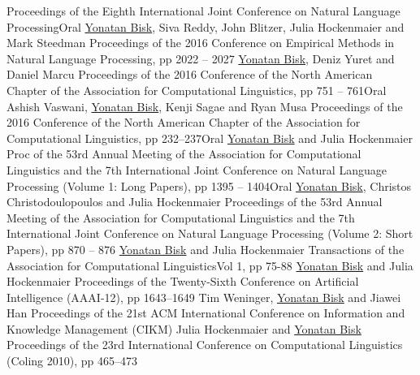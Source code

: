 \documentclass[10pt,letter]{moderncv}
\newcommand{\YB}{\underline{Yonatan Bisk}}
\begin{document}
  {Proceedings of the Eighth International Joint Conference on Natural Language Processing}{Oral}{}
  {\href{http://yonatanbisk.com/papers/2016-EMNLP.pdf}{\color{linkcolor}{Evaluating Induced CCG Parsers on Grounded Semantic Parsing}}}
{\YB{}, Siva Reddy, John Blitzer, Julia Hockenmaier and Mark Steedman}
  {Proceedings of the 2016 Conference on Empirical Methods in Natural Language Processing, pp 2022 -- 2027}{}{}
\pub{--}
  {\href{http://yonatanbisk.com/papers/2016-NAACL.pdf}{\color{linkcolor}{Natural Language Communication with Robots}}}
  {\YB{}, Deniz Yuret and Daniel Marcu}
  {Proceedings of the 2016 Conference of the North American Chapter of the Association for Computational Linguistics, pp 751 -- 761}{Oral}{}
\pub{--}
  {\href{http://yonatanbisk.com/papers/2016-NAACLShort.pdf}{\color{linkcolor}{Supertagging With LSTMs}}}
  {Ashish Vaswani, \YB, Kenji Sagae and Ryan Musa}
  {Proceedings of the 2016 Conference of the North American Chapter of the Association for Computational Linguistics, pp 232--237}{Oral}{}
  {\href{http://yonatanbisk.com/papers/2015-ACL.pdf}{\color{linkcolor}{Probing the Linguistic Strengths and Limitations of Unsupervised Grammar Induction}}}
  {\YB{} and Julia Hockenmaier}
  {Proc of the 53rd Annual Meeting of the Association for Computational Linguistics and the 7th International Joint Conference on Natural Language Processing (Volume 1: Long Papers), pp 1395 -- 1404}{Oral}{}
\pub{--}
  {\href{http://yonatanbisk.com/papers/2015-ACLShort-Fixed.pdf}{\color{linkcolor}{Labeled Grammar Induction with Minimal Supervision}}}
  {\YB, Christos Christodoulopoulos and Julia Hockenmaier}
  {Proceedings of the 53rd Annual Meeting of the Association for Computational Linguistics and the 7th International Joint Conference on Natural Language Processing (Volume 2: Short Papers), pp 870 -- 876 }{}{}
  {\href{http://yonatanbisk.com/papers/2013-TACL.pdf}{\color{linkcolor}{An HDP Model for Inducing Combinatory Categorial Grammars}}}
  {\YB{} and Julia Hockenmaier}
  {Transactions of the Association for Computational Linguistics}{Vol 1, pp 75-88}{}
  {\href{http://yonatanbisk.com/papers/2012-AAAI.pdf}{\color{linkcolor}{Simple Robust Grammar Induction with Combinatory Categorial Grammars}}}
  {\YB{} and Julia Hockenmaier}
  {Proceedings of the Twenty-Sixth Conference on Artificial Intelligence (AAAI-12), pp 1643--1649}{}{}
\pub{--}
  {\href{http://yonatanbisk.com/papers/2012-CIKM.pdf}{\color{linkcolor}{Document-Topic Hierarchies from Document Graphs}}}
  {Tim Weninger, \YB{} and Jiawei Han}
  {Proceedings of the 21st ACM International Conference on Information and Knowledge Management (CIKM)}{}{}
  {\href{http://yonatanbisk.com/papers/2010-COLING.pdf}{\color{linkcolor}{Normal-form parsing for Combinatory Categorial Grammars with generalized composition and type-raising}}}
  {Julia Hockenmaier and \YB{}}
  {Proceedings of the 23rd International Conference on Computational Linguistics (Coling 2010), pp 465--473}{}{}
\end{document}
